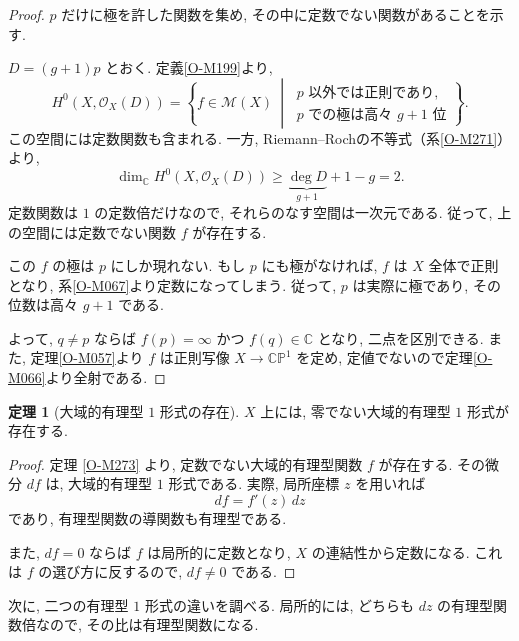 \documentclass[dvipdfmx,a4paper,11pt]{article} %
\newcommand{\C}{\mathbb{C}}
\theoremstyle{definition}
\newtheorem{thm}{定理}[section]
\numberwithin{equation}{section}
\begin{document}
\begin{proof}
$p$ だけに極を許した関数を集め,
その中に定数でない関数があることを示す.

$D=(g+1)p$ とおく.
定義\ref{O-M199}より,
\[
H^0(X,\mathcal O_X(D))
=
\left\{
f\in\mathcal M(X)\ \middle|\
\begin{array}{l}
p\text{ 以外では正則であり,}\\
p\text{ での極は高々 }g+1\text{ 位}
\end{array}
\right\}.
\]
この空間には定数関数も含まれる.
一方, Riemann--Rochの不等式（系\ref{O-M271}）より,
\[
\dim_{\C}H^0(X,\mathcal O_X(D))
\geq
\underbrace{\deg D}_{g+1}+1-g
=2.
\]
定数関数は $1$ の定数倍だけなので,
それらのなす空間は一次元である.
従って, 上の空間には定数でない関数 $f$ が存在する.

この $f$ の極は $p$ にしか現れない.
もし $p$ にも極がなければ, $f$ は $X$ 全体で正則となり,
系\ref{O-M067}より定数になってしまう.
従って, $p$ は実際に極であり,
その位数は高々 $g+1$ である.

よって, $q\neq p$ ならば
$f(p)=\infty$ かつ $f(q)\in\C$ となり,
二点を区別できる.
また, 定理\ref{O-M057}より $f$ は正則写像
$X\to\C\mathbb P^1$ を定め,
定値でないので定理\ref{O-M066}より全射である.
\end{proof}

\begin{thm}[大域的有理型 $1$ 形式の存在]\label{O-M281}
$X$ 上には, 零でない大域的有理型 $1$ 形式が存在する.
\end{thm}

\begin{proof}
定理 \ref{O-M273} より, 
定数でない大域的有理型関数 $f$ が存在する.
その微分 $df$ は, 大域的有理型 $1$ 形式である.
実際, 局所座標 $z$ を用いれば
\[
df=f'(z)\,dz
\]
であり, 有理型関数の導関数も有理型である.

また, $df=0$ ならば $f$ は局所的に定数となり, 
$X$ の連結性から定数になる.
これは $f$ の選び方に反するので, $df\neq0$ である.
\end{proof}

次に, 二つの有理型 $1$ 形式の違いを調べる.
局所的には, どちらも $dz$ の有理型関数倍なので, 
その比は有理型関数になる.
\end{document}
